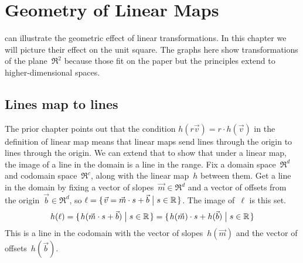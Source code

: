 \chapter{Geometry of Linear Maps}

\Sage{} can illustrate the geometric effect of linear transformations.
In this chapter we will picture their effect on the unit square.
The graphs here show transformations of the plane~$\Re^2$
because those fit on the paper but the principles extend to 
higher-dimensional spaces.




\section{Lines map to lines}
The prior chapter points out that 
the condition $h(r\vec{v})=r\cdot h(\vec{v})$ in the definition
of linear map means that
linear maps send lines through the origin to lines through the origin.
We can extend that to show that under a linear map, the image of a line
in the domain is a line in the range.
Fix a domain space~$\Re^d$ and codomain space~$\Re^c$, along with
the linear map~$h$ between them.
Get a line in the domain by fixing a vector of slopes~$\vec{m}\in\Re^d$
and a vector of offsets from the origin~$\vec{b}\in\Re^d$, so  
$\ell = \mbox{$\{\hspace{0.1em}\vec{v}=\vec{m}\cdot s +\vec{b}\bigm| s\in\mathbb{R}\hspace{0.1em}\}$}$.
The image of~$\ell$ is this set.
\begin{equation*}
  h(\ell)=\mbox{$\{\hspace{0.1em}h(\vec{m}\cdot s+\vec{b})\bigm| s\in\mathbb{R}\hspace{0.1em}\}$}
  =\mbox{$\{\hspace{0.1em}h(\vec{m})\cdot s+h(\vec{b})\bigm| s\in\mathbb{R}\hspace{0.1em}\}$}
\end{equation*}
This is a line in the codomain with the vector of 
slopes~$h(\vec{m})$ and the vector of offsets~$h(\vec{b})$. 

